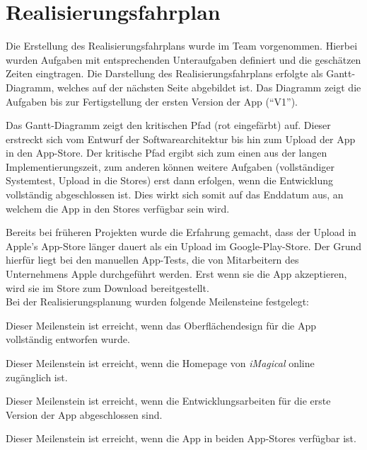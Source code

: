 \chapter{Realisierungsfahrplan}

Die Erstellung des Realisierungsfahrplans wurde im Team vorgenommen.
Hierbei wurden Aufgaben mit entsprechenden Unteraufgaben definiert und die geschätzen Zeiten eingtragen.
Die Darstellung des Realisierungsfahrplans erfolgte als Gantt-Diagramm, welches auf der nächsten Seite abgebildet ist.
Das Diagramm zeigt die Aufgaben bis zur Fertigstellung der ersten Version der App (``V1'').

Das Gantt-Diagramm zeigt den kritischen Pfad (rot eingefärbt) auf.
Dieser erstreckt sich vom Entwurf der Softwarearchitektur bis hin zum Upload der App in den App-Store.
Der kritische Pfad ergibt sich zum einen aus der langen Implementierungszeit, zum anderen können weitere Aufgaben (vollständiger Systemtest, Upload in die Stores) erst dann erfolgen, wenn die Entwicklung vollständig abgeschlossen ist.
Dies wirkt sich somit auf das Enddatum aus, an welchem die App in den Stores verfügbar sein wird.

Bereits bei früheren Projekten wurde die Erfahrung gemacht, dass der Upload in Apple's App-Store länger dauert als ein Upload im Google-Play-Store. Der Grund hierfür liegt bei den manuellen App-Tests, die von Mitarbeitern des Unternehmens Apple durchgeführt werden. Erst wenn sie die App akzeptieren, wird sie im Store zum Download bereitgestellt. \\

Bei der Realisierungsplanung wurden folgende Meilensteine festgelegt:
\begin{description}[leftmargin=!,labelwidth=\widthof{\bfseries KONZEPTION APP UI}]
\item [KONZEPTION APP-UI] Dieser Meilenstein ist erreicht, wenn das Oberflächendesign für die App vollständig entworfen wurde.
\item [WEBSEITE LIVE] Dieser Meilenstein ist erreicht, wenn die Homepage von \textit{iMagical} online zugänglich ist.
\item [APP V1] Dieser Meilenstein ist erreicht, wenn die Entwicklungsarbeiten für die erste Version der App abgeschlossen sind.
\item [APP ONLINE] Dieser Meilenstein ist erreicht, wenn die App in beiden App-Stores verfügbar ist.
\end{description}

 
